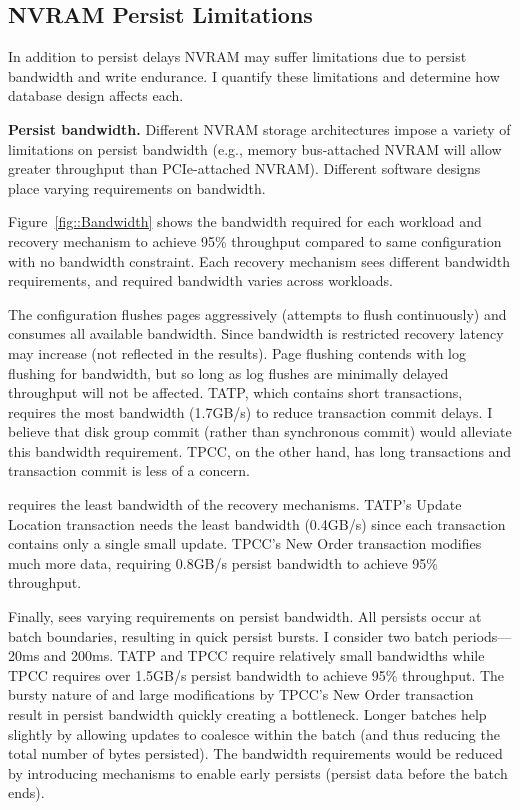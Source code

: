\subsection{NVRAM Persist Limitations}
\label{sec:OLTP_eval:Persists:Limitations}

In addition to persist delays NVRAM may suffer limitations due to persist bandwidth and write endurance.
I quantify these limitations and determine how database design affects each.

\textbf{Persist bandwidth.}
Different NVRAM storage architectures impose a variety of limitations on persist bandwidth (e.g., memory bus-attached NVRAM will allow greater throughput than PCIe-attached NVRAM).
Different software designs place varying requirements on bandwidth.


Figure~\ref{fig::Bandwidth} shows the bandwidth required for each workload and recovery mechanism to achieve 95\% throughput compared to same configuration with no bandwidth constraint.
Each recovery mechanism sees different bandwidth requirements, and required bandwidth varies across workloads.

The \NVDisk configuration flushes pages aggressively (attempts to flush continuously) and consumes all available bandwidth.
Since bandwidth is restricted recovery latency may increase (not reflected in the results).
Page flushing contends with log flushing for bandwidth, but so long as log flushes are minimally delayed throughput will not be affected.
TATP, which contains short transactions, requires the most bandwidth (1.7GB/s) to reduce transaction commit delays.
I believe that disk group commit (rather than synchronous commit) would alleviate this bandwidth requirement.
TPCC, on the other hand, has long transactions and transaction commit is less of a concern.

\InPlace requires the least bandwidth of the recovery mechanisms.
TATP's Update Location transaction needs the least bandwidth (0.4GB/s) since each transaction contains only a single small update.
TPCC's New Order transaction modifies much more data, requiring 0.8GB/s persist bandwidth to achieve 95\% throughput.

Finally, \GroupCommit sees varying requirements on persist bandwidth.
All persists occur at batch boundaries, resulting in quick persist bursts.
I consider two batch periods---20ms and 200ms.
TATP and TPCC require relatively small bandwidths while TPCC requires over 1.5GB/s persist bandwidth to achieve 95\% throughput.
The bursty nature of \GroupCommit and large modifications by TPCC's New Order transaction result in persist bandwidth quickly creating a bottleneck.
Longer batches help slightly by allowing updates to coalesce within the batch (and thus reducing the total number of bytes persisted).
The bandwidth requirements would be reduced by introducing mechanisms to enable early persists (persist data before the batch ends).

